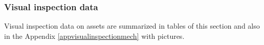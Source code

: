 %	

\subsubsection{Visual inspection data}
Visual inspection data on assets are summarized in tables of this section and also in the Appendix \ref{appvisualinspectionmech} with pictures.


